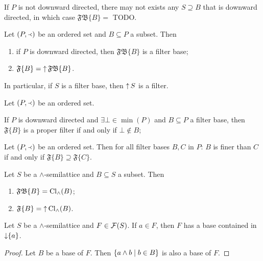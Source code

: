 If $P$ is not downward directed, there may not exists any $S \supseteq B$ that is downward directed, in which case $\mathfrak{FB}\{B\} =$ TODO.

\begin{proposition}
Let $\left( P,\Yleft \right)$ be an ordered set and $B\subseteq P$ a subset. Then
\begin{enumerate}
\item if $P$ is downward directed, then $\mathfrak{FB}\{B\}$ is a filter base;
\item $\mathfrak{F}\{B\} = \operatorname{\uparrow}\mathfrak{FB}\{B\}$.
\end{enumerate}
\end{proposition}
In particular, if $S$ is a filter base, then $\operatorname{\uparrow} S$ is a filter.

\begin{lemma}
Let $\left( P,\Yleft \right)$ be an ordered set.

If $P$ is downward directed and $\exists \bot \in \min(P)$ and $B \subseteq P$ a filter base, then $\mathfrak{F}\{B\}$ is a proper filter \textup{if and only if} $\bot \notin B$; 
\end{lemma}

\begin{proposition}
Let $\left( P,\Yleft \right)$ be an ordered set. Then for all filter bases $B,C$ in $P$: $B$ is finer than $C$ \textup{if and only if} $\mathfrak{F}\{B\} \supseteq \mathfrak{F}\{C\}$.
\end{proposition}

\begin{proposition} \label{filterGenerationSemilattice}
Let $S$ be a $\wedge$-semilattice and $B\subseteq S$ a subset. Then
\begin{enumerate}
\item $\mathfrak{FB}\{B\} = \operatorname{Cl}_\wedge(B)$;
\item $\mathfrak{F}\{B\} = \operatorname{\uparrow}\operatorname{Cl}_\wedge(B)$.
\end{enumerate}
\end{proposition}

\begin{proposition} \label{baseTraceFilter}
Let $S$ be a $\wedge$-semilattice and $F\in\operatorname{\mathcal{F}}(S)$. If $a\in F$, then $F$ has a base contained in $\operatorname{\downarrow}\{a\}$.
\end{proposition}
\begin{proof}
Let $B$ be a base of $F$. Then $\left\{ a\wedge b \;\middle|\; b\in B \right\}$ is also a base of $F$.
\end{proof}

